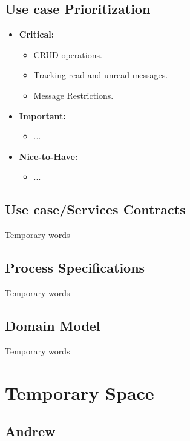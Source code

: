 \documentclass[11pt]{article}
\begin{document}
\subsection{Use case Prioritization}
\begin{itemize}
\item \textbf{Critical: }
	\begin{itemize}
		\item CRUD operations.
		\item Tracking read and unread messages.
		\item Message Restrictions.
	\end{itemize}

\item \textbf{Important: }
	\begin{itemize}
		\item ...
	\end{itemize}

\item \textbf{Nice-to-Have: }
	\begin{itemize}
		\item ...
	\end{itemize}
\end{itemize}
\subsection{Use case/Services Contracts}
Temporary words
\subsection{Process Specifications}
Temporary words
\subsection{Domain Model}
Temporary words

\newpage
\section{Temporary Space}

\subsection{Andrew}
\end{document}
